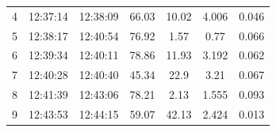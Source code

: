 \begin{table}[!htp]
{\begin{tabular}{ccccccc}
4                                                  & 12:37:14                                                  & 12:38:09                                                & 66.03                                                           & 10.02                                                         & 4.006                                                                   & 0.046                                                           \\
5                                                  & 12:38:17                                                  & 12:40:54                                                & 76.92                                                           & 1.57                                                          & 0.77                                                                    & 0.066                                                           \\
6                                                  & 12:39:34                                                  & 12:40:11                                                & 78.86                                                           & 11.93                                                         & 3.192                                                                   & 0.062                                                           \\
7                                                  & 12:40:28                                                  & 12:40:40                                                & 45.34                                                           & 22.9                                                          & 3.21                                                                    & 0.067                                                           \\
8                                                  & 12:41:39                                                  & 12:43:06                                                & 78.21                                                           & 2.13                                                          & 1.555                                                                   & 0.093                                                           \\
9                                                  & 12:43:53                                                  & 12:44:15                                                & 59.07                                                           & 42.13                                                         & 2.424                                                                   & 0.013                                                           \\ \hline
\end{tabular}%
}
\end{table}

